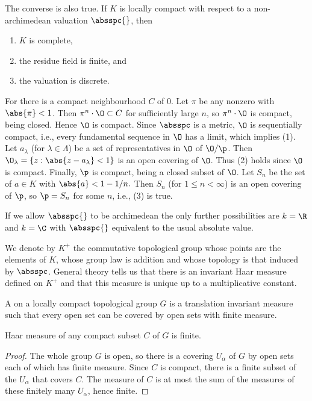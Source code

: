 \documentclass[11pt]{book}
\begin{document}
\begin{ch}
\begin{remark}\label{rem:locally_compact}
The converse is also true.  If $K$ is locally compact with respect to
a non-archimedean valuation $\absspc{}$, then
\begin{enumerate}
\item $K$ is complete,
\item the residue field is finite, and
\item the valuation is discrete.
\end{enumerate}
For there is a compact neighbourhood $C$ of $0$.
Let $\pi$ be any nonzero with $\abs{\pi}<1$.
Then $\pi^n\cdot
\O\subset C$ for sufficiently large $n$, so $\pi^n\cdot \O$ is
compact, being closed.  Hence $\O$ is compact.  Since $\absspc$ is a
metric, $\O$ is sequentially compact, i.e., every fundamental sequence
in $\O$ has a limit, which implies (1).  Let $a_\lambda$ (for
$\lambda\in\Lambda$) be a set of representatives in $\O$ of $\O/\p$.
Then $\O_{\lambda} = \{z : \abs{z-a_{\lambda}}<1\}$ is an open
covering of $\O$.  Thus (2) holds since $\O$ is compact.  Finally,
$\p$ is compact, being a closed subset of $\O$.  Let $S_n$ be the set
of $a\in K$ with $\abs{a}<1-1/n.$  Then $S_n$ (for $1\leq n < \infty$)
is an open covering of $\p$, so $\p=S_n$ for some $n$, i.e., (3) is
true.

If we allow $\absspc{}$ to be archimedean the only further
possibilities are $k=\R$ and $k=\C$ with $\absspc{}$ equivalent to the
usual absolute value.
\end{remark}

We denote by $K^+$ the commutative topological group whose points are
the elements of $K$, whose group law is addition and whose topology is
that induced by $\absspc$.  General theory tells us that there is an
invariant Haar measure defined on $K^+$ and that this
measure is unique up to a multiplicative constant.

\begin{definition}\label{defn:haar}
A  on a locally compact topological group
$G$ is a translation invariant measure such that every open
set can be covered by open sets with finite measure.
\end{definition}

\begin{lemma}
  Haar measure of any compact subset $C$ of $G$ is finite.
\end{lemma}
\begin{proof}
The whole group $G$ is open, so there is a covering $U_\alpha$
of $G$ by open sets each of which has finite measure.
Since $C$ is compact, there is a finite subset of the $U_\alpha$
that covers $C$.  The measure of $C$ is at most the sum of
the measures of these finitely many $U_\alpha$, hence finite.
\end{proof}


\end{ch}
\end{document}
